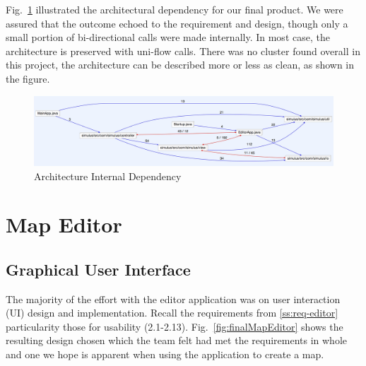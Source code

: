 Fig.~\ref{fig:archIntDependency} illustrated the architectural dependency for our final product. We were assured that the outcome echoed to the requirement and design, though only a small portion of bi-directional calls were made internally. In most case, the architecture is preserved with uni-flow calls. There was no cluster found overall in this project, the architecture can be described more or less as clean, as shown in the figure. 

\begin{figure}[h]
	\begin{center}
			\includegraphics[width=\textwidth]{img/archIntDependency.png}
		\caption{Architecture Internal Dependency}
		\label{fig:archIntDependency}
	\end{center}
\end{figure}

\section{Map Editor}

\subsection{Graphical User Interface}
The majority of the effort with the editor application was on user interaction (UI) design and implementation. Recall the requirements from \ref{ss:req-editor} particularity those for usability (2.1-2.13). Fig.~\ref{fig:finalMapEditor} shows the resulting design chosen which the team felt had met the requirements in whole and one we hope is apparent when using the application to create a map.


